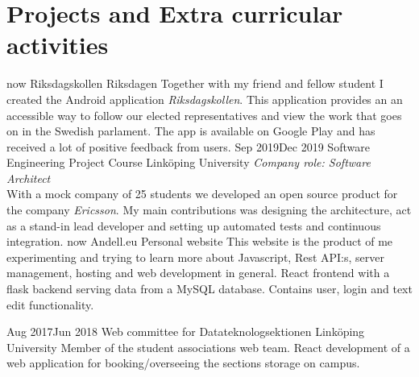 \documentclass[]{k-cv} %
\begin{document}
\section{Projects and Extra curricular activities}
\begin{entrylist}
\entry
{\to now}
{Riksdagskollen}
{Riksdagen}
{Together with my friend and fellow student I created the Android application \textit{Riksdagskollen}. This application provides an an accessible way to follow our elected representatives and view the work that goes on in the Swedish parlament. The app is available on Google Play and has received a lot of positive feedback from users.}
\entry
{Sep 2019\newline\to Dec 2019 }
{Software Engineering Project Course}
{Linköping University}
{\emph{Company role: Software Architect}\\ With a mock company of 25 students we developed an open source product for the company \textit{Ericsson}. My main contributions was designing the architecture, act as a stand-in lead developer and setting up automated tests and continuous integration. }
\entry
{\to now}
{Andell.eu}
{Personal website}
{This website is the product of me experimenting and trying to learn more about
Javascript, Rest API:s, server management, hosting and web development in general. React frontend with a flask backend serving data from a MySQL database. Contains user, login and text edit functionality.}

\entry
{Aug 2017\newline\to Jun 2018}
{Web committee for Datateknologsektionen}
{Linköping University}
{Member of the student associations web team. React development of a web application for booking/overseeing the sections storage on
campus.}
\end{entrylist}





\clearpage




\end{document}
